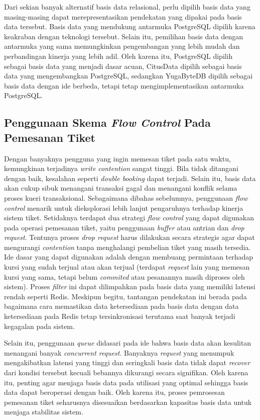 Dari sekian banyak alternatif basis data relasional, perlu dipilih basis data yang masing-masing dapat merepresentasikan pendekatan yang dipakai pada basis data tersebut. Basis data yang mendukung antarmuka PostgreSQL dipilih karena keakraban dengan teknologi tersebut. Selain itu, pemilihan basis data dengan antarmuka yang sama memungkinkan pengembangan yang lebih mudah dan perbandingan kinerja yang lebih adil. Oleh karena itu, PostgreSQL dipilih sebagai basis data yang menjadi dasar acuan, CitusData dipilih sebagai basis data yang mengembangkan PostgreSQL, sedangkan YugaByteDB dipilih sebagai basis data dengan ide berbeda, tetapi tetap mengimplementasikan antarmuka PostgreSQL.

\subsection{Penggunaan Skema \textit{Flow Control} Pada Pemesanan Tiket}

Dengan banyaknya pengguna yang ingin memesan tiket pada satu waktu, kemungkinan terjadinya \textit{write contention} sangat tinggi. Bila tidak ditangani dengan baik, kesalahan seperti \textit{double booking} dapat terjadi. Selain itu, basis data akan cukup sibuk menangani transaksi gagal dan menangani konflik selama proses kueri transaksional. Sebagaimana dibahas sebelumnya, penggunaan \textit{flow control} menarik untuk dieksplorasi lebih lanjut pengaruhnya terhadap kinerja sistem tiket. Setidaknya terdapat dua strategi \textit{flow control} yang dapat digunakan pada operasi pemesanan tiket, yaitu penggunaan \textit{buffer} atau antrian dan \textit{drop request}. Tentunya proses \textit{drop request} harus dilakukan secara strategis agar dapat mengurangi \textit{contention} tanpa menghalangi pembelian tiket yang masih tersedia. Ide dasar yang dapat digunakan adalah dengan membuang permintaan terhadap kursi yang sudah terjual atau akan terjual (terdapat \textit{request} lain yang memesan kursi yang sama, tetapi belum \textit{commited} atau pesanannya masih diproses oleh sistem). Proses \textit{filter} ini dapat dilimpahkan pada basis data yang memiliki latensi rendah seperti Redis. Meskipun begitu, tantangan pendekatan ini berada pada bagaimana cara memastikan data ketersediaan pada basis data dengan data ketersediaan pada Redis tetap tersinkronisasi terutama saat banyak terjadi kegagalan pada sistem.

Selain itu, penggunaan \textit{queue} didasari pada ide bahwa basis data akan kesulitan menangani banyak \textit{concurrent request}. Banyaknya \textit{request} yang menumpuk mengakibatkan latensi yang tinggi dan seringkali basis data tidak dapat \textit{recover} dari kondisi tersebut kecuali bebannya dikurangi secara signifikan. Oleh karena itu, penting agar menjaga basis data pada utilisasi yang optimal sehingga basis data dapat beroperasi dengan baik. Oleh karena itu, proses pemrosesan pemesanan tiket seharusnya disesuaikan berdasarkan kapasitas basis data untuk menjaga stabilitas sistem.

